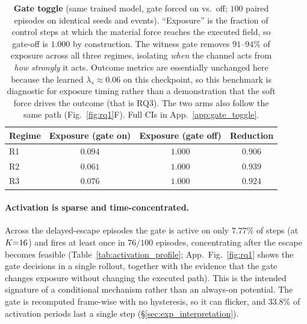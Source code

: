 \begin{table}[t]
\centering
\caption{\textbf{Gate toggle} (same trained model, gate forced on vs.\ off;
$100$ paired episodes on identical seeds and events). ``Exposure'' is the
fraction of control steps at which the material force reaches the executed
field, so gate-off is $1.000$ by construction. The witness gate removes
$91$--$94\%$ of exposure across all three regimes, isolating \emph{when} the
channel acts from \emph{how strongly} it acts. Outcome metrics are essentially
unchanged here because the learned $\lambda_s\!\approx\!0.06$ on this
checkpoint, so this benchmark is diagnostic for exposure timing rather than a
demonstration that the soft force drives the outcome (that is RQ3). The two
arms also follow the same path (Fig.~\ref{fig:rq1}F). Full CIs in
App.~\ref{app:gate_toggle}.}
\label{tab:gate_toggle}
\small
\setlength{\tabcolsep}{6pt}\renewcommand{\arraystretch}{1.1}
\begin{tabular}{lccc}
\toprule
Regime & Exposure (gate on) & Exposure (gate off) & Reduction \\
\midrule
R1 & $0.094$ & $1.000$ & $0.906$ \\
R2 & $0.061$ & $1.000$ & $0.939$ \\
R3 & $0.076$ & $1.000$ & $0.924$ \\
\bottomrule
\end{tabular}
\end{table}

\paragraph{Activation is sparse and time-concentrated.}
Across the delayed-escape episodes the gate is active on only $7.77\%$ of steps (at $K{=}16$) and fires at least once in $76/100$ episodes, concentrating after the escape becomes feasible (Table~\ref{tab:activation_profile}; App.~Fig.~\ref{fig:rq1} shows the gate decisions in a single rollout, together with the evidence that the gate changes exposure without changing the executed path). This is the intended signature of a conditional mechanism rather than an always-on potential. The gate is recomputed frame-wise with no hysteresis, so it can flicker, and $33.8\%$ of activation periods last a single step (\S\ref{sec:exp_interpretation}).


